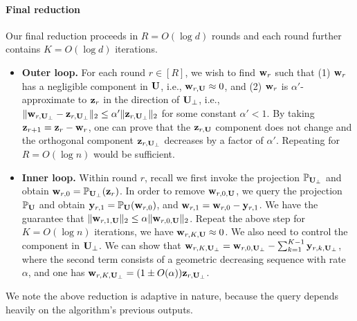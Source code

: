 \paragraph{Final reduction} Our final reduction proceeds in $R = O(\log d)$ rounds and each round further contains $K = O(\log d)$ iterations.
\begin{itemize}
\item {\bf Outer loop.} For each round $r \in [R]$, we wish to find $\mathbf{w}_{r}$ such that  
(1) $\mathbf{w}_{r}$ has a negligible component in $\mathbf{U}$, i.e., $\mathbf{w}_{r, \mathbf{U}} \approx 0$, and  
(2) $\mathbf{w}_{r}$ is $\alpha'$-approximate to $\mathbf{z}_{r}$ in the direction of $\mathbf{U}_{\perp}$, i.e., $\|\mathbf{w}_{r, \mathbf{U}_\perp} - \mathbf{z}_{r, \mathbf{U}_\perp}\|_2 \leq \alpha' \|\mathbf{z}_{r, \mathbf{U}_\perp}\|_2$ for some constant $\alpha' < 1$. 
By taking $\mathbf{z}_{r+1} = \mathbf{z}_{r} - \mathbf{w}_{r}$, one can prove that the $\mathbf{z}_{r,\mathbf{U}}$ component does not change and the orthogonal component $\mathbf{z}_{r, \mathbf{U}_\perp}$ decreases by a factor of $\alpha'$. Repeating for $R = O(\log n)$ would be sufficient.
\item {\bf Inner loop.} Within round $r$, recall we first invoke the projection $\mathbb{P}_{\mathbf{U}_{\perp}}$ and obtain  
$\mathbf{w}_{r, 0} = \mathbb{P}_{\mathbf{U}_{\perp}}(\mathbf{z}_r)$. 
In order to remove $\mathbf{w}_{r, 0, \mathbf{U}}$, we query the projection $\mathbb{P}_{\mathbf{U}}$ and obtain 
$\mathbf{y}_{r, 1} = \mathbb{P}_{\mathbf{U}}(\mathbf{w}_{r,0})$, and $\mathbf{w}_{r, 1} = \mathbf{w}_{r, 0} - \mathbf{y}_{r,1}$. 
We have the guarantee that $\|\mathbf{w}_{r, 1, \mathbf{U}}\|_2 \leq \alpha \|\mathbf{w}_{r, 0, \mathbf{U}}\|_2$. Repeat the above step for $K = O(\log n)$ iterations, we have $\mathbf{w}_{r, K, \mathbf{U}}\approx 0$. We also need to control the component in $\mathbf{U}_{\perp}$. We can show that $\mathbf{w}_{r, K, \mathbf{U}_{\perp}} = \mathbf{w}_{r, 0,\mathbf{U}_{\perp}} - \sum_{k=1}^{K-1}\mathbf{y}_{r, k, \mathbf{U}_{\perp}}$, where the second term consists of a geometric decreasing sequence with rate $\alpha$, and one has $\mathbf{w}_{r, K, \mathbf{U}_{\perp}} = (1 \pm O(\alpha))\mathbf{z}_{r, \mathbf{U}_\perp}$.
\end{itemize}

We note the above reduction is adaptive in nature, because the query depends heavily on the algorithm's previous outputs. 




